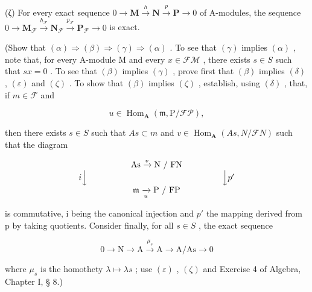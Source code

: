 (ζ) For every exact sequence \(0 \to \mathbf{M} \xrightarrow{h} \mathbf{N} \xrightarrow{p} \mathbf{P} \to 0\) of A-modules, the sequence \(0 \longrightarrow \mathbf{M}_{\mathcal{F}} \xrightarrow{h_{\mathcal{F}}} \mathbf{N}_{\mathcal{F}} \xrightarrow{p_{\mathcal{F}}} \mathbf{P}_{\mathcal{F}} \longrightarrow 0\) is exact.

(Show that \((\alpha) \Rightarrow (\beta) \Rightarrow (\gamma) \Rightarrow (\alpha)\) . To see that \((\gamma)\) implies \((\alpha)\) , note that, for every A-module M and every \(x \in \mathcal{FM}\) , there exists \(s \in S\) such that \(sx = 0\) . To see that \((\beta)\) implies \((\gamma)\) , prove first that \((\beta)\) implies \((\delta)\) , \((\varepsilon)\) and \((\zeta)\) . To show that \((\beta)\) implies \((\zeta)\) , establish, using \((\delta)\) , that, if \(m \in \mathcal{F}\) and

\[
u \in \operatorname{Hom} _ {\mathbf {A}} (\mathfrak {m}, \mathrm{P} / \mathscr {F P}),
\]

then there exists \(s \in S\) such that \(As \subset m\) and \(v \in \operatorname{Hom}_{\mathbf{A}}(As, N/\mathcal{F}N)\) such that the diagram

\[
\begin{array}{c} \text {As} \xrightarrow {v} \text {N / FN} \\ i \Big \downarrow \qquad \qquad \qquad \qquad \qquad \qquad \qquad \qquad \Big \downarrow p ^ {\prime} \\ \mathfrak {m} \xrightarrow [ u ]{} \text {P / FP} \end{array}
\]

is commutative, i being the canonical injection and \(p'\) the mapping derived from p by taking quotients. Consider finally, for all \(s \in S\) , the exact sequence

\[
0 \longrightarrow \mathrm{N} \longrightarrow \mathrm{A} \xrightarrow {\mu_ {s}} \mathrm{A} \longrightarrow \mathrm{A} / \mathrm{As} \longrightarrow 0
\]

where \(\mu_s\) is the homothety \(\lambda \mapsto \lambda s\) ; use \((\varepsilon)\) , \((\zeta)\) and Exercise 4 of Algebra, Chapter I, § 8.)

